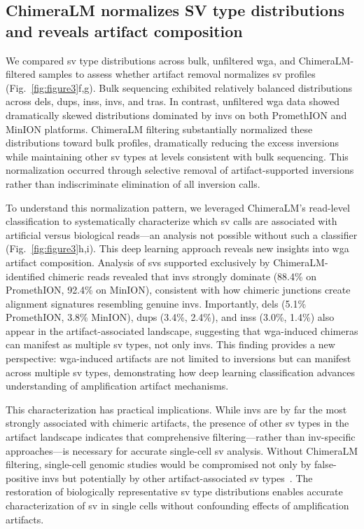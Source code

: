 \documentclass[pdflatex,sn-nature,lineno]{sn-jnl}%
\theoremstyle{thmstyleone}%
\theoremstyle{thmstyletwo}%
\theoremstyle{thmstylethree}%
\begin{document}
\subsection*{ChimeraLM normalizes SV type distributions and reveals artifact composition}

We compared \gls{sv} type distributions across bulk, unfiltered \gls{wga}, and ChimeraLM-filtered samples to assess whether artifact removal normalizes \gls{sv} profiles (Fig.~\ref{fig:figure3}f,g).
Bulk sequencing exhibited relatively balanced distributions across \glspl{del}, \glspl{dup}, \glspl{ins}, \glspl{inv}, and \glspl{tra}.
In contrast, unfiltered \gls{wga} data showed dramatically skewed distributions dominated by \glspl{inv} on both PromethION and MinION platforms.
ChimeraLM filtering substantially normalized these distributions toward bulk profiles, dramatically reducing the excess inversions while maintaining other \gls{sv} types at levels consistent with bulk sequencing.
This normalization occurred through selective removal of artifact-supported inversions rather than indiscriminate elimination of all inversion calls.

To understand this normalization pattern, we leveraged ChimeraLM's read-level classification to systematically characterize which \gls{sv} calls are associated with artificial versus biological reads—an analysis not possible without such a classifier (Fig.~\ref{fig:figure3}h,i).
This deep learning approach reveals new insights into \gls{wga} artifact composition.
Analysis of \glspl{sv} supported exclusively by ChimeraLM-identified chimeric reads revealed that \glspl{inv} strongly dominate (88.4\% on PromethION, 92.4\% on MinION), consistent with how chimeric junctions create alignment signatures resembling genuine \glspl{inv}.
Importantly, \glspl{del} (5.1\% PromethION, 3.8\% MinION), \glspl{dup} (3.4\%, 2.4\%), and \glspl{ins} (3.0\%, 1.4\%) also appear in the artifact-associated landscape, suggesting that \gls{wga}-induced chimeras can manifest as multiple \gls{sv} types, not only \glspl{inv}.
This finding provides a new perspective: \gls{wga}-induced artifacts are not limited to inversions but can manifest across multiple \gls{sv} types, demonstrating how deep learning classification advances understanding of amplification artifact mechanisms.

This characterization has practical implications.
While \glspl{inv} are by far the most strongly associated with chimeric artifacts, the presence of other \gls{sv} types in the artifact landscape indicates that comprehensive filtering—rather than \gls{inv}-specific approaches—is necessary for accurate single-cell \gls{sv} analysis.
Without ChimeraLM filtering, single-cell genomic studies would be compromised not only by false-positive \glspl{inv} but potentially by other artifact-associated \gls{sv} types~\cite{kosugi2019comprehensive, mahmoud2019structural}. 
The restoration of biologically representative \gls{sv} type distributions enables accurate characterization of \gls{sv} in single cells without confounding effects of amplification artifacts.
\end{document}
